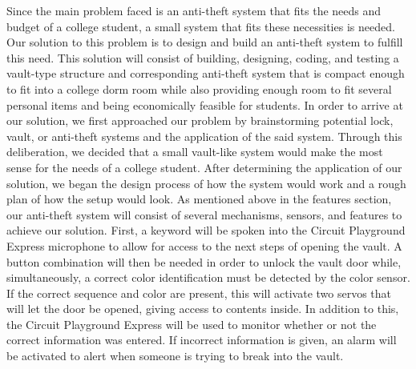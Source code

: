 \documentclass[12pt]{article}
\begin{document}
Since the main problem faced is an anti-theft system that fits the needs and budget of a college student, a small system that fits these necessities is needed. Our solution to this problem is to design and build an anti-theft system to fulfill this need. This solution will consist of building, designing, coding, and testing a vault-type structure and corresponding anti-theft system that is compact enough to fit into a college dorm room while also providing enough room to fit several personal items and being economically feasible for students.
In order to arrive at our solution, we first approached our problem by brainstorming potential lock, vault, or anti-theft systems and the application of the said system. Through this deliberation, we decided that a small vault-like system would make the most sense for the needs of a college student. After determining the application of our solution, we began the design process of how the system would work and a rough plan of how the setup would look.
As mentioned above in the features section, our anti-theft system will consist of several mechanisms, sensors, and features to achieve our solution. First, a keyword will be spoken into the Circuit Playground Express microphone to allow for access to the next steps of opening the vault. A button combination will then be needed in order to unlock the vault door while, simultaneously, a correct color identification must be detected by the color sensor. If the correct sequence and color are present, this will activate two servos that will let the door be opened, giving access to contents inside. In addition to this, the Circuit Playground Express will be used to monitor whether or not the correct information was entered. If incorrect information is given, an alarm will be activated to alert when someone is trying to break into the vault.
\end{document}
